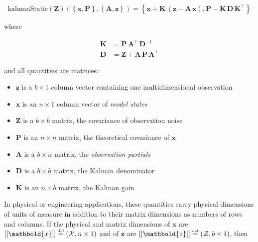 \documentclass[10pt,oneside,x11names]{article}
\begin{document}
\begin{equation}
\label{eqn:kalman-cume-definition}
\text{kalmanStatic}
\left(
\mathbold{Z}
\right)
\left(
\left\{
\mathbold{x},
\mathbold{P}
\right\},
\left\{
\mathbold{A},
\mathbold{z}
\right\}
\right) =
\left\{
\mathbold{x}+
\mathbold{K}\,
\left(
\mathbold{z}-
\mathbold{A}\,
\mathbold{x}
\right),
\mathbold{P}-
\mathbold{K}\,
\mathbold{D}\,
\mathbold{K}^\intercal
\right\}
\end{equation}

\noindent where

\begin{align}
\label{eqn:kalman-gain-definition}
\mathbold{K}
&=
\mathbold{P}\,
\mathbold{A}^\intercal\,
\mathbold{D}^{-1} \\
\label{eqn:kalman-denominator-definition}
\mathbold{D}
&= \mathbold{Z} +
\mathbold{A}\,
\mathbold{P}\,
\mathbold{A}^\intercal
\end{align}

\noindent and all quantities are matrices:

\begin{itemize}
\item \(\mathbold{z}\) is a  \({b}\times{1}\) column vector containing one multidimensional observation
\item \(\mathbold{x}\) is an \({n}\times{1}\) column vector of \emph{model states}
\item \(\mathbold{Z}\) is a  \({b}\times{b}\) matrix, the covariance of
observation noise
\item \(\mathbold{P}\) is an \({n}\times{n}\) matrix, the theoretical
covariance of \(\mathbold{x}\)
\item \(\mathbold{A}\) is a  \({b}\times{n}\) matrix, the \emph{observation partials}
\item \(\mathbold{D}\) is a  \({b}\times{b}\) matrix, the Kalman denominator
\item \(\mathbold{K}\) is an \({n}\times{b}\) matrix, the Kalman gain
\end{itemize}

In physical or engineering applications, these quantities carry physical
dimensions of units of measure in addition to their matrix dimensions as numbers
of rows and columns. 
If the physical and matrix dimensions of 
\(\mathbold{x}\) 
are
\(\left[\left[\mathbold{x}\right]\right]
\stackrel{\text{\tiny def}}{=}
(\mathcal{X}, n\times{1})\)
and of 
\(\mathbold{z}\) 
are
\(\left[\left[\mathbold{z}\right]\right]
\stackrel{\text{\tiny def}}{=}
(\mathcal{Z}, b\times{1})\), then
\end{document}

